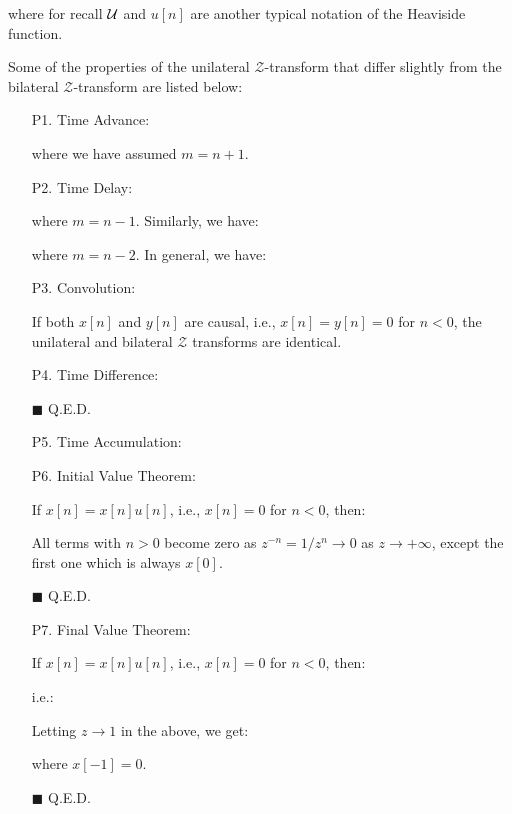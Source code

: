 	where for recall $\cal U$ and $u[n]$ are another typical notation of the Heaviside function.
	
	Some of the properties of the unilateral $\mathcal{Z}$-transform that differ slightly from the bilateral $\mathcal{Z}$-transform are listed below:
	\begin{enumerate}
		\item[P1.] Time Advance:
		
		where we have assumed $m=n+1$.
		
		\item[P2.] Time Delay:
		
		where $m=n-1$. Similarly, we have:
		
		where $m=n-2$. In general, we have:
		
		
		\item[P3.] Convolution:
		
		If both $x[n]$ and $y[n]$ are causal, i.e., $x[n]=y[n]=0$ for $n<0$, the unilateral and bilateral $\mathcal{Z}$ transforms are identical.
		
		\item[P4.] Time Difference:
		
		\begin{dem}
		
		\begin{flushright}
			$\blacksquare$  Q.E.D.
		\end{flushright}
		\end{dem} 
		
		
		\item[P5.] Time Accumulation:
		
		
		\item[P6.] Initial Value Theorem:
		
		If $x[n]=x[n]u[n]$, i.e., $x[n]=0$ for $n<0$, then:
		
		\begin{dem}
		
		All terms with $n>0$ become zero as $z^{-n}=1/z^n \rightarrow 0$ as 
		$z \rightarrow {+\infty}$, except the first one which is always $x[0]$.
		\begin{flushright}
			$\blacksquare$  Q.E.D.
		\end{flushright}
		\end{dem}		
		
		\item[P7.] Final Value Theorem:
		
		If $x[n]=x[n]u[n]$, i.e., $x[n]=0$ for $n<0$, then:
		
		\begin{dem}

		i.e.:
		
		Letting $z\rightarrow 1$ in the above, we get:
		
		where $x[-1]=0$.
		\begin{flushright}
			$\blacksquare$  Q.E.D.
		\end{flushright}
		\end{dem}
	\end{enumerate}
	
